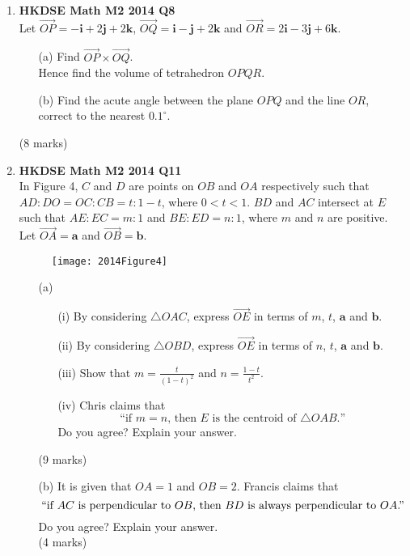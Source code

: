 \documentclass[12pt]{article}
\begin{document}
\begin{enumerate}
	\newpage

	\item \textbf{HKDSE Math M2 2014 Q8}\\
	Let 
	$\overrightarrow{OP} = -\textbf{i} +2 \textbf{j} +2\textbf {k}$, 
	$\overrightarrow{OQ} = \textbf{i} - \textbf{j} +2\textbf {k}$ and 
	$\overrightarrow{OR} = 2\textbf{i} -3 \textbf{j} +6\textbf {k}$. 
	\begin{enumerate}
		\item [(a)]Find $\overrightarrow{OP} \times \overrightarrow{OQ}$. \\
		Hence find the volume of tetrahedron $OPQR$. 
		\item [(b)]Find the acute angle between the plane $OPQ$ and the line $OR$, \\
		correct to the nearest $0.1^\circ$.
	\end{enumerate}
	(8 marks)

	\item \textbf{HKDSE Math M2 2014 Q11}\\
	In Figure 4, $C$ and $D$ are points on $OB$ and $OA$ respectively such that $AD : DO = OC : CB = t : 1-t$, where $0 < t < 1$. $BD$ and $AC$ intersect at $E$ such that $AE : EC = m : 1 $ and $BE : ED = n : 1 $, where $m$ and $n$ are positive. Let $\overrightarrow{OA} = \textbf{a}$ and $\overrightarrow{OB} = \textbf{b}$. 
	\begin{figure}[H]
		\centering
		\texttt{[image: 2014Figure4]}
	\end{figure}
	\begin{enumerate}
		\item [(a)]
		\begin{enumerate}
			\item [(i)]By considering $\triangle OAC$, express $\overrightarrow{OE}$ in terms of $m$, $t$, $\textbf{a}$ and $\textbf{b}$.
			\item [(ii)]By considering $\triangle OBD$, express $\overrightarrow{OE}$ in terms of $n$, $t$, $\textbf{a}$ and $\textbf{b}$.
			\item [(iii)]Show that $\displaystyle m = \frac{t}{(1-t)^2}$ and $\displaystyle n = \frac{1-t}{t^2}$. 
			\item [(iv)]Chris claims that 
				$$\text{``if }m = n\text{, then }E\text{ is the centroid of }\triangle OAB\text{.''}$$
				Do you agree? Explain your answer.
		\end{enumerate}
		(9 marks)
		\item [(b)]It is given that $OA = 1$ and $OB = 2$. Francis claims that 
			$$``\text{if }AC\text{ is perpendicular to }OB\text{, then }BD\text{ is always perpendicular to }OA\text{.''}$$
			Do you agree? Explain your answer. \\(4 marks)
	\end{enumerate}


\end{enumerate}
\end{document}
